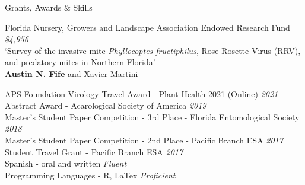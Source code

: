 \documentclass{resume} %
\begin{document}
\begin{rSection}{Grants, Awards \& Skills}

Florida Nursery, Growers and Landscape Association Endowed Research Fund \hfill {\em \textit{\$4,956}}\\
`Survey of the invasive mite \textit{Phyllocoptes fructiphilus}, Rose Rosette Virus (RRV),\\
 and predatory mites in Northern Florida'\\
\textbf{Austin N. Fife} and Xavier Martini

APS Foundation Virology Travel Award - Plant Health 2021 (Online) \hfill {\em \textit{2021}}\\
Abstract Award - Acarological Society of America \hfill {\em \textit{2019}}\\
Master's Student Paper Competition - 3rd Place - Florida Entomological Society \hfill {\em \textit{2018}}\\
Master's Student Paper Competition - 2nd Place - Pacific Branch ESA \hfill {\em \textit{2017}}\\
Student Travel Grant - Pacific Branch ESA \hfill {\em \textit{2017}}\\
Spanish - oral and written \hfill {\em \textit{Fluent}}\\
Programming Languages - R, LaTex \hfill {\em \textit{Proficient}}\\

\end{rSection}
\end{document}
